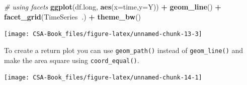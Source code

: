 \documentclass[12pt,]{book}
\newenvironment{Shaded}{\begin{snugshade}}{\end{snugshade}}
\newcommand{\CommentTok}[1]{\textcolor[rgb]{0.56,0.35,0.01}{\textit{#1}}}
\newcommand{\DataTypeTok}[1]{\textcolor[rgb]{0.13,0.29,0.53}{#1}}
\newcommand{\KeywordTok}[1]{\textcolor[rgb]{0.13,0.29,0.53}{\textbf{#1}}}
\newcommand{\NormalTok}[1]{#1}
\newcommand{\OperatorTok}[1]{\textcolor[rgb]{0.81,0.36,0.00}{\textbf{#1}}}
\newcommand{\StringTok}[1]{\textcolor[rgb]{0.31,0.60,0.02}{#1}}
\begin{document}
\begin{Shaded}
\begin{Highlighting}[]
\CommentTok{# using facets}
\KeywordTok{ggplot}\NormalTok{(df.long, }\KeywordTok{aes}\NormalTok{(}\DataTypeTok{x=}\NormalTok{time,}\DataTypeTok{y=}\NormalTok{Y)) }\OperatorTok{+}
\StringTok{  }\KeywordTok{geom_line}\NormalTok{() }\OperatorTok{+}\StringTok{ }
\StringTok{  }\KeywordTok{facet_grid}\NormalTok{(TimeSeries}\OperatorTok{~}\NormalTok{.) }\OperatorTok{+}
\StringTok{  }\KeywordTok{theme_bw}\NormalTok{()}
\end{Highlighting}
\end{Shaded}

\begin{center}\texttt{[image: CSA-Book\_files/figure-latex/unnamed-chunk-13-3]} \end{center}

To create a return plot you can use \texttt{geom\_path()} instead of \texttt{geom\_line()} and make the area square using \texttt{coord\_equal()}.

\begin{Shaded}
\end{Shaded}

\begin{center}\texttt{[image: CSA-Book\_files/figure-latex/unnamed-chunk-14-1]} \end{center}
\end{document}
